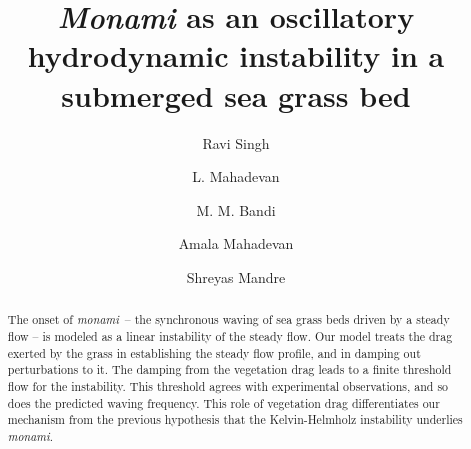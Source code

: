 \documentclass[aps,prl,twocolumn,superscriptaddress,10pt]{revtex4-1}  %
\newcommand{\monami}{\textit{monami}}
\begin{document}
\title{\textit{Monami} as an oscillatory hydrodynamic instability in a submerged sea grass bed}
\author{Ravi Singh}
\author{L. Mahadevan}
\author{M. M. Bandi}
\author{Amala Mahadevan}
\author{Shreyas Mandre}

\begin{abstract}
The onset of \monami ~-- the synchronous waving of sea grass beds driven by a steady flow -- is modeled as a linear instability of the steady flow. Our model treats the drag exerted by the grass in establishing the steady flow profile, and in damping out perturbations to it. The damping from the vegetation drag leads to a finite threshold flow for the instability. This threshold agrees with experimental observations, and so does the predicted waving frequency. This role of vegetation drag differentiates our mechanism from the previous hypothesis that the Kelvin-Helmholz instability underlies \monami.
\end{abstract}
\end{document}
